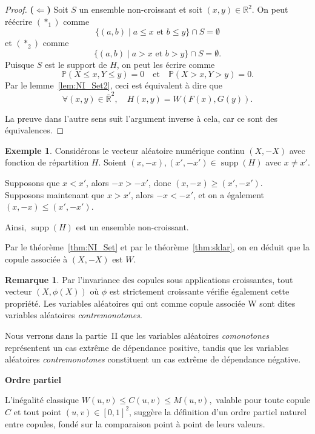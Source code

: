 \documentclass[a4paper,11pt]{amsbook}
\numberwithin{equation}{chapter}
\theoremstyle{definition}
\newtheorem{exemple}	[theoreme]   {Exemple}
\newtheorem{remark}[theoreme]{Remarque}
\begin{document}
\begin{proof}
\textbf{(\(\Leftarrow\))}  
Soit $S$ un ensemble non-croissant et soit $(x,y) \in \mathbb{R}^2$.  
On peut réécrire $(\ast_1)$ comme  
\[
\{(a,b) \mid a \leq x \text{ et } b \leq y\} \cap S = \emptyset
\]  
et $(\ast_2)$ comme  
\[
\{(a,b) \mid a > x \text{ et } b > y\} \cap S = \emptyset.
\]  
Puisque $S$ est le support de $H$, on peut les écrire comme  
\[
\mathbb{P}(X \leq x, Y \leq y) = 0 \quad \text{et} \quad \mathbb{P}(X > x, Y > y) = 0.
\]  
Par le lemme~\ref{lem:NI_Set2}, ceci est équivalent à dire que  
\[
\forall (x,y) \in \overline{\mathbb{R}}^2, \quad H(x,y) = W(F(x),G(y)).
\]  

La preuve dans l'autre sens suit l'argument inverse à cela, car ce sont des équivalences.
\end{proof}

\begin{exemple}\label{ex:NI_Set}
Considérons le vecteur aléatoire numérique continu \( (X, -X) \) avec fonction de répartition \( H \). Soient \( (x,-x), (x',-x') \in \operatorname{supp}(H) \) avec \( x \neq x' \).

Supposons que \( x < x' \), alors \( -x > -x' \), donc \( (x, -x) \geq (x', -x') \).\\
Supposons maintenant que \( x > x' \), alors \( -x < -x' \), et on a également \( (x, -x) \leq (x', -x') \).

Ainsi, \( \operatorname{supp}(H) \) est un ensemble non-croissant.

Par le théorème~\ref{thm:NI_Set} et par le théorème~\ref{thm:sklar}, on en déduit que la copule associée à \( (X, -X) \) est $W$.
\end{exemple}

\begin{remark}\label{rem:NI_Set1}
Par l'invariance des copules sous applications croissantes, tout vecteur \( (X, \phi(X)) \) où \( \phi \) est strictement croissante vérifie également cette propriété. Les variables aléatoires qui ont comme copule associée W sont dites variables aléatoires \emph{contremonotones}.
\end{remark}

Nous verrons dans la partie~II que les variables aléatoires \emph{comonotones} représentent un cas extrême de dépendance positive, tandis que les variables aléatoires \emph{contremonotones} constituent un cas extrême de dépendance négative.

\textbf{Ordre partiel}

L’inégalité classique \( W(u,v) \leq C(u,v) \leq M(u,v),\)
valable pour toute copule \( C \) et tout point \( (u,v) \in [0,1]^2 \), suggère la définition d’un ordre partiel naturel entre copules, fondé sur la comparaison point à point de leurs valeurs.
\end{document}
